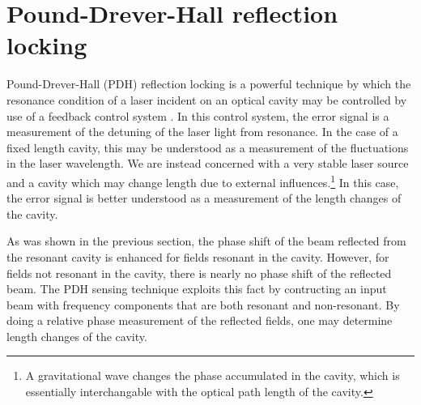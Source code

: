\section{Pound-Drever-Hall reflection locking}
Pound-Drever-Hall (PDH) reflection locking is a powerful technique by which the resonance condition of a laser incident on an optical cavity may be controlled by use of a feedback control system \cite{PDH}. %
In this control system, the error signal is a measurement of the detuning of the laser light from resonance. %
In the case of a fixed length cavity, this may be understood as a measurement of the fluctuations in the laser wavelength. %
We are instead concerned with a very stable laser source and a cavity which may change length due to external influences.\footnote{A gravitational wave changes the phase accumulated in the cavity, which is essentially interchangable with the optical path length of the cavity.} In this case, the error signal is better understood as a measurement of the length changes of the cavity.

As was shown in the previous section, the phase shift of the beam reflected from the resonant cavity is enhanced for fields resonant in the cavity. %
However, for fields not resonant in the cavity, there is nearly no phase shift of the reflected beam. %
The PDH sensing technique exploits this fact by contructing an input beam with frequency components that are both resonant and non-resonant. %
By doing a relative phase measurement of the reflected fields, one may determine length changes of the cavity.

